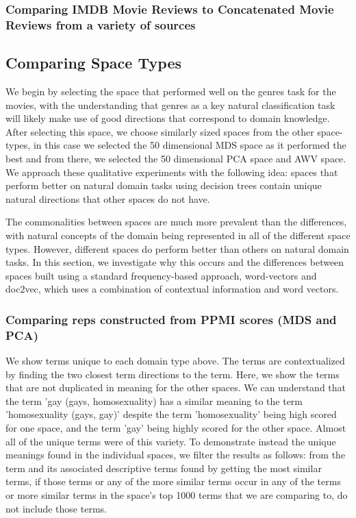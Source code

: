 \subsubsection{Comparing IMDB Movie Reviews to Concatenated Movie Reviews from a variety of sources}


\subsection{Comparing Space Types}

We begin by selecting the space that performed well on the genres task for the movies, with the understanding that genres as a key natural classification task will likely make use of good directions that correspond to domain knowledge. After selecting this space, we choose similarly sized spaces from the other space-types, in this case we selected the 50 dimensional MDS space as it performed the best and from there, we selected the 50 dimensional PCA space and AWV space. We approach these qualitative experiments with the following idea: spaces that perform better on natural domain tasks using decision trees contain unique natural directions that other spaces do not have. 

The commonalities between spaces are much more prevalent than the differences, with natural concepts of the domain being represented in all of the different space types. However, different spaces do perform better than others on natural domain tasks. In this section, we investigate why this occurs and the differences between spaces built using a standard frequency-based approach, word-vectors and doc2vec, which uses a combination of contextual information and word vectors. 

\subsubsection{Comparing reps constructed from PPMI scores (MDS and PCA)}

We show terms unique to each domain type above. The terms are contextualized by finding the two closest term directions to the term. Here, we show the terms that are not duplicated in meaning for the other spaces. We can understand that the term 'gay (gays, homosexuality) has a similar meaning to the term 'homosexuality (gays, gay)' despite the term 'homosexuality' being high scored for one space, and the term 'gay' being highly scored for the other space. Almost all of the unique terms were of this variety. To demonstrate instead the unique meanings found in the individual spaces, we filter the results as follows: from the term and its associated descriptive terms found by getting the most similar terms, if those terms or any of the more similar terms occur in any of the terms or more similar terms in the space's top 1000 terms that we are comparing to, do not include those terms.

